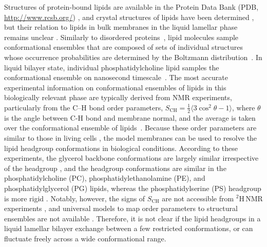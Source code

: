 \documentclass[journal=jpcbfk,manuscript=article]{achemso}
\begin{document}
Structures of protein-bound lipids are available in the Protein Data Bank (PDB, \url{http://www.rcsb.org/}) \cite{berman00},
and crystal structures of lipids have been determined \cite{buldt81,pascher92},
but their relation to lipids in bulk membranes in the liquid lamellar phase remains unclear \cite{marsh13b}. Similarly to disordered proteins~\cite{sormanni17}, lipid molecules sample conformational ensembles that are composed of sets of individual structures whose occurrence probabilities are determined by the Boltzmann distribution~\cite{buslaev16}. In liquid bilayer state, individual phosphatidylcholine lipid samples the conformational ensemble on nanosecond timescale~\cite{ferreira15,antila21a}. The most accurate experimental information on conformational ensembles of lipids
in this biologically relevant phase are typically derived from NMR experiments, particularly from the
C--H bond order parameters, $S_\mathrm{CH}=\frac{1}{2} \langle 3\cos^2 \theta -1 \rangle$, where $\theta$ is the angle between C-H bond and membrane normal, and the average is taken over the conformational ensemble of lipids~\cite{seelig77c,davis83,Semchyschyn04}.
Because these order parameters are similar to those in living cells \cite{gally81,scherer87,seelig90},
the model membranes can be used to resolve the lipid headgroup conformations in biological conditions.
According to these experiments, the glycerol backbone conformations are largely similar irrespective of the headgroup \cite{gally81}, and
the headgroup conformations are similar in the phosphatidylcholine (PC), phosphatidylethanolamine (PE), and phosphatidylglycerol (PG) lipids,
whereas the phosphatidylserine (PS) headgroup is more rigid \cite{wohlgemuth80,buldt81}. 
Notably, however, the signs of $S_\mathrm{CH}$ are not accessible from $^2$H\,NMR experiments \cite{ollila16},
and universal models to map order parameters to structural ensembles are not available \cite{pezeshkian18,akutsu20}.
Therefore, it is not clear if the lipid headgroups in a liquid lamellar bilayer exchange between a few restricted conformations, or can fluctuate freely across a wide conformational range.
\end{document}
